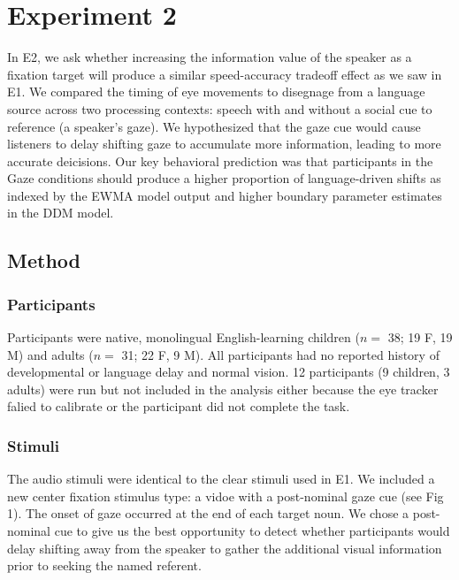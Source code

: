 \documentclass[10pt, letterpaper]{article}
\begin{document}
\section{Experiment 2}\label{experiment-2}

In E2, we ask whether increasing the information value of the speaker as
a fixation target will produce a similar speed-accuracy tradeoff effect
as we saw in E1. We compared the timing of eye movements to disegnage
from a language source across two processing contexts: speech with and
without a social cue to reference (a speaker's gaze). We hypothesized
that the gaze cue would cause listeners to delay shifting gaze to
accumulate more information, leading to more accurate deicisions. Our
key behavioral prediction was that participants in the Gaze conditions
should produce a higher proportion of language-driven shifts as indexed
by the EWMA model output and higher boundary parameter estimates in the
DDM model.

\subsection{Method}\label{method-1}

\subsubsection{Participants}\label{participants-1}

Participants were native, monolingual English-learning children (\(n=\)
38; 19 F, 19 M) and adults (\(n=\) 31; 22 F, 9 M). All participants had
no reported history of developmental or language delay and normal
vision. 12 participants (9 children, 3 adults) were run but not included
in the analysis either because the eye tracker falied to calibrate or
the participant did not complete the task.

\subsubsection{Stimuli}\label{stimuli-1}

The audio stimuli were identical to the clear stimuli used in E1. We
included a new center fixation stimulus type: a vidoe with a
post-nominal gaze cue (see Fig 1). The onset of gaze occurred at the end
of each target noun. We chose a post-nominal cue to give us the best
opportunity to detect whether participants would delay shifting away
from the speaker to gather the additional visual information prior to
seeking the named referent.
\end{document}
